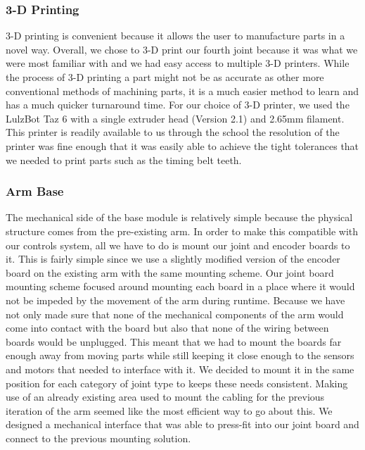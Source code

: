 \subsubsection{3-D Printing}
3-D printing is convenient because it allows the user to manufacture parts in a novel way. Overall, we chose to 3-D print our fourth joint because it was what we were most familiar with and we had easy access to multiple 3-D printers.  While the process of 3-D printing a part might not be as accurate as other more conventional methods of machining parts, it is a much easier method to learn and has a much quicker turnaround time. For our choice of 3-D printer, we used the LulzBot Taz 6 \cite{Taz6} with a single extruder head (Version 2.1) and 2.65mm filament. This printer is readily available to us through the school the resolution of the printer was fine enough that it was easily able to achieve the tight tolerances that we needed to print parts such as the timing belt teeth.    


\subsubsection{Arm Base}
The mechanical side of the base module is relatively simple because the physical structure comes from the pre-existing arm. In order to make this compatible with our controls system, all we have to do is mount our joint and encoder boards to it.  This is fairly simple since we use a slightly modified version of the encoder board on the existing arm with the same mounting scheme. Our joint board mounting scheme focused around mounting each board in a place where it would not be impeded by the movement of the arm during runtime. Because we have not only made sure that none of the mechanical components of the arm would come into contact with the board but also that none of the wiring between boards would be unplugged. This meant that we had to mount the boards far enough away from moving parts while still keeping it close enough to the sensors and motors that needed to interface with it. We decided to mount it in the same position for each category of joint type to keeps these needs consistent. Making use of an already existing area used to mount the cabling for the previous iteration of the arm seemed like the most efficient way to go about this. We designed a mechanical interface that was able to press-fit into our joint board and connect to the previous mounting solution.

